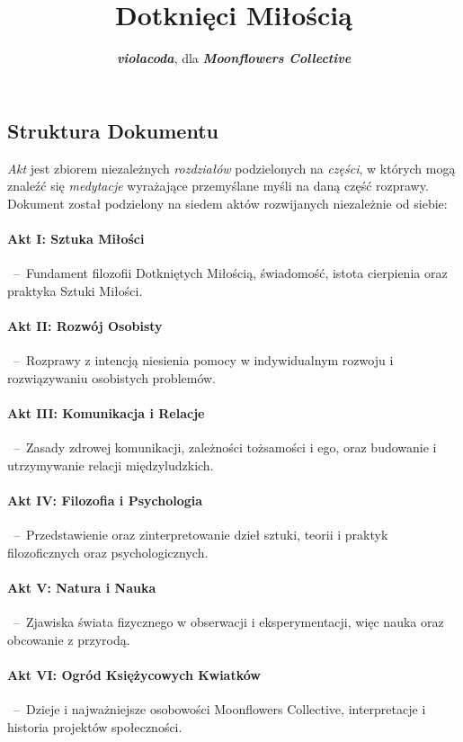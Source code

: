 \documentclass[]{coda-art}
\title{Dotknięci Miłością}
\author{\textbf{\emph{violacoda}}, dla \textbf{\emph{Moonflowers Collective}}}
\begin{document}
\maketitle

\subsection*{Struktura Dokumentu}
\emph{Akt} jest zbiorem niezależnych \emph{rozdziałów} podzielonych na \emph{części}, w których mogą znaleźć się \emph{medytacje} wyrażające przemyślane myśli na daną część rozprawy.
Dokument został podzielony na siedem aktów rozwijanych niezależnie od siebie:

\paragraph*{Akt I: Sztuka Miłości}\, --\, Fundament filozofii Dotkniętych Miłością, świadomość, istota cierpienia oraz praktyka Sztuki Miłości.

\paragraph*{Akt II: Rozwój Osobisty}\, --\, Rozprawy z intencją niesienia pomocy w indywidualnym rozwoju i rozwiązywaniu osobistych problemów.

\paragraph*{Akt III: Komunikacja i Relacje}\, --\, Zasady zdrowej komunikacji, zależności tożsamości i ego, oraz budowanie i utrzymywanie relacji międzyludzkich.

\paragraph*{Akt IV: Filozofia i Psychologia}\, --\, Przedstawienie oraz zinterpretowanie dzieł sztuki, teorii i praktyk filozoficznych oraz psychologicznych.

\paragraph*{Akt V: Natura i Nauka}\, --\, Zjawiska świata fizycznego w obserwacji i eksperymentacji, więc nauka oraz obcowanie z przyrodą.

\paragraph*{Akt VI: Ogród Księżycowych Kwiatków}\, --\, Dzieje i najważniejsze osobowości Moonflowers Collective, interpretacje i historia projektów społeczności.
\end{document}
